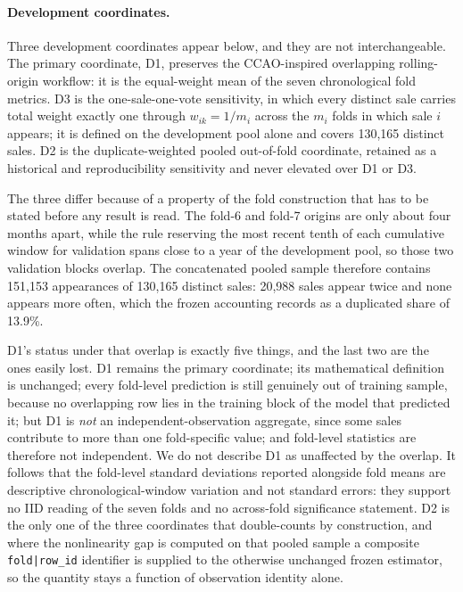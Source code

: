 \documentclass[10pt]{article}
\theoremstyle{definition}
\newcommand{\1}{\mathbf{1}}
\begin{document}
\paragraph{Development coordinates.}
Three development coordinates appear below, and they are not interchangeable.
The primary coordinate, D1, preserves the CCAO-inspired overlapping rolling-origin
workflow: it is the equal-weight mean of the seven chronological fold metrics. D3 is the
one-sale-one-vote sensitivity, in which every distinct sale carries total weight exactly
one through $w_{ik}=1/m_i$ across the $m_i$ folds in which sale $i$ appears; it is defined
on the development pool alone and covers 130,165 distinct sales. D2 is the
duplicate-weighted pooled out-of-fold coordinate, retained as a historical and
reproducibility sensitivity and never elevated over D1 or D3.

The three differ because of a property of the fold construction that has to be
stated before any result is read. The fold-6 and fold-7 origins are only about four months
apart, while the rule reserving the most recent tenth of each cumulative window for
validation spans close to a year of the development pool, so those two validation blocks
overlap. The concatenated pooled sample therefore contains 151,153 appearances of 130,165
distinct sales: 20,988 sales appear twice and none appears more often, which the frozen
accounting records as a duplicated share of 13.9\%.

D1's status under that overlap is exactly five things, and the last two are the
ones easily lost. D1 remains the primary coordinate; its mathematical definition is
unchanged; every fold-level prediction is still genuinely out of training sample, because
no overlapping row lies in the training block of the model that predicted it; but D1 is
\emph{not} an independent-observation aggregate, since some sales contribute to more than
one fold-specific value; and fold-level statistics are therefore not independent. We do
not describe D1 as unaffected by the overlap. It follows that the fold-level standard
deviations reported alongside fold means are descriptive chronological-window variation
and not standard errors: they support no IID reading of the seven folds and no across-fold
significance statement. D2 is the only one of the three coordinates that double-counts by
construction, and where the nonlinearity gap is computed on that pooled sample a composite
\texttt{fold|row\_id} identifier is supplied to the otherwise unchanged frozen estimator,
so the quantity stays a function of observation identity alone.
\end{document}
